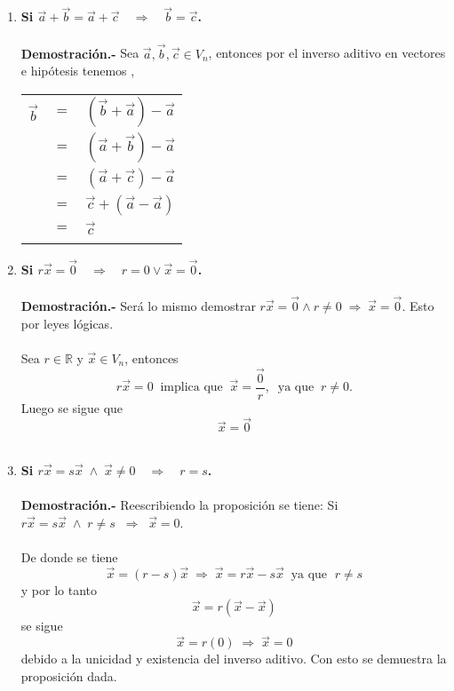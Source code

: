 \begin{enumerate}
\begin{enumerate}[\bfseries a)]
    \item \textbf{\boldmath Si $\vec{a}+\vec{b}=\vec{a}+\vec{c} \quad \Longrightarrow \quad \vec{b}=\vec{c}$.\\\\
	Demostración.-}\; Sea $\vec{a},\vec{b},\vec{c} \in V_n$, entonces por el inverso aditivo en vectores e hipótesis tenemos ,
	\begin{center}
	    \begin{tabular}{rcl}
		$\vec{b}$&$=$&$(\vec{b}+\vec{a})-\vec{a}$\\
		&$=$&$(\vec{a}+\vec{b})-\vec{a}$\\
		&$=$&$(\vec{a}+\vec{c})-\vec{a}$\\
		&$=$&$\vec{c}+(\vec{a}-\vec{a})$\\
		&$=$&$\vec{c}$\\\\
	    \end{tabular}
	\end{center}

    \item \textbf{\boldmath Si $r\vec{x}=\vec{0}\quad \Longrightarrow \quad r=0 \lor \vec{x}=\vec{0}$.\\\\
	Demostración.-}\; Será lo mismo demostrar $r\vec{x}=\vec{0}  \land r\neq 0\;\Longrightarrow\;\vec{x}=\vec{0}$. Esto por leyes lógicas.\\\\
	Sea $r\in \mathbb{R}$ y $\vec{x} \in V_n$, entonces $$r\vec{x}=0 \;\; \mbox{implica que}\;\;  \vec{x}=\dfrac{\vec{0}}{r}, \;\; \mbox{ya que}\;\; r\neq 0.$$ Luego se sigue que $$\vec{x}=\vec{0}$$\\

    \item \textbf{\boldmath Si $r\vec{x}=s\vec{x}\;\land\; \vec{x}\neq 0 \quad \Longrightarrow \quad r=s$.\\\\
	Demostración.-}\; Reescribiendo la proposición se tiene: Si $r\vec{x}=s\vec{x}\; \land \; r\neq s \;\; \Longrightarrow \; \; \vec{x}=0$.\\\\ 
	De donde se tiene $$\vec{x}=(r-s)\vec{x} \; \Longrightarrow \; \vec{x}=r\vec{x}-s\vec{x} \; \; \mbox{ya que }\; r\neq s$$ 
	y por lo tanto $$\vec{x}=r(\vec{x}-\vec{x})$$
	se sigue $$\vec{x}=r(0) \; \Longrightarrow \; \vec{x}=0$$
	debido a la unicidad y existencia del inverso aditivo. Con esto se demuestra la proposición dada.\\\\


\end{enumerate}
\end{enumerate}
